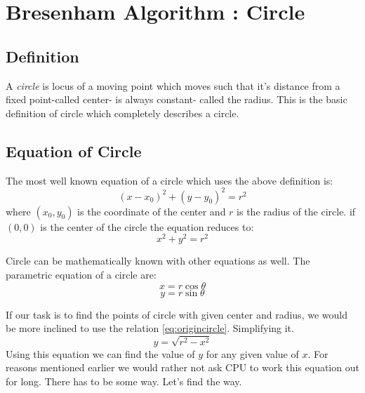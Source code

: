 \documentclass[a4paper,12pt,oneside]{book}
\begin{document}
\chapter{Bresenham Algorithm : Circle}
\section{Definition}

 A \emph{circle} is locus of a moving point which moves such that it's distance from a fixed point-called center- is always constant- called the radius. This is the basic definition of circle which completely describes a circle. 
\section{Equation of Circle}
The most well known equation of a circle which uses the above definition is:
\begin{equation} \label{eq:generalcircle}
	(x-x_0)^2+(y-y_0)^2=r^2
\end{equation}
where $(x_0,y_0)$ is the coordinate of the center and $r$ is the radius of the circle. if $(0,0)$ is the center of the circle the equation reduces to:
\begin{equation} \label{eq:origincircle}
	x^2+y^2=r^2
\end{equation} 

Circle can be mathematically known with other equations as well. The parametric equation of a circle are:
\begin{equation}
	x=r\cos\theta
\end{equation}
\begin{equation}
	y=r\sin\theta
\end{equation}

If our task is to find the points of circle with given center and radius, we would be more inclined to use the relation \ref{eq:origincircle}. Simplifying it.
\begin{equation}
	y=\sqrt{r^2-x^2}
\end{equation}
 Using this equation we can find the value of $y$ for any given value of $x$. For reasons mentioned earlier we would rather not ask CPU to work this equation out for long. There has to be some way. Let's find the way.
\end{document}
